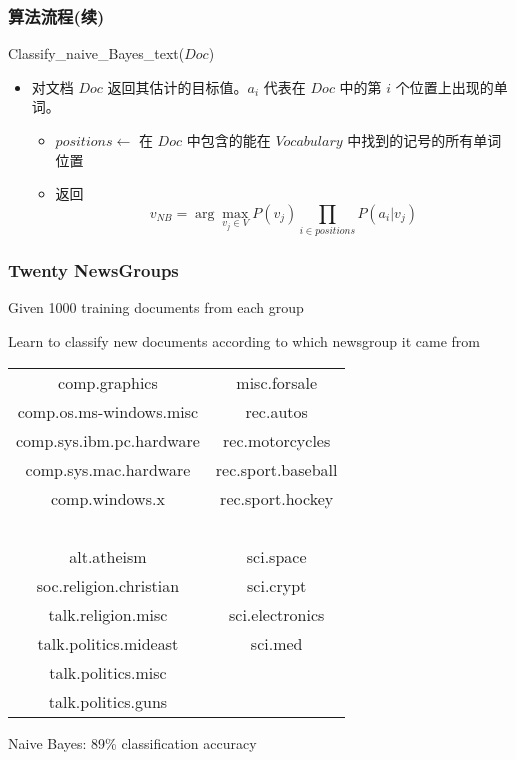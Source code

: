 \documentclass{beamer}
\begin{document}
\begin{frame}
\frametitle{算法流程(续)}
\label{sec-7-12}

Classify\_{}naive\_{}Bayes\_{}text($Doc$)
\begin{itemize}
\item 对文档 $Doc$ 返回其估计的目标值。$a_i$ 代表在 $Doc$ 中的第 $i$ 个位置上出现的单词。
\begin{itemize}
\item $positions \leftarrow$ 在 $Doc$ 中包含的能在 $Vocabulary$ 中找到的记号的所有单词位置
\item 返回
     $$v_{NB} = \arg\max_{v_{j} \in V} P(v_{j}) \prod_{i \in positions}P(a_{i}|v_{j})$$
\end{itemize}
\end{itemize}
\end{frame}
\begin{frame}
\frametitle{Twenty NewsGroups}
\label{sec-7-13}


\small

Given 1000 training documents from each group

Learn to classify new documents according to which newsgroup it came from

\bigskip
\begin{center}
\begin{tabular}{cc}
comp.graphics & misc.forsale\\
comp.os.ms-windows.misc & rec.autos \\
comp.sys.ibm.pc.hardware & rec.motorcycles \\
comp.sys.mac.hardware & rec.sport.baseball \\
comp.windows.x & rec.sport.hockey \\
\ & \ \\
alt.atheism & sci.space \\
soc.religion.christian  & sci.crypt\\
talk.religion.misc & sci.electronics\\
talk.politics.mideast & sci.med \\
talk.politics.misc & \ \\
talk.politics.guns & \ \\
\end{tabular}
\end{center}


Naive Bayes: 89\% classification accuracy
\end{frame}
\end{document}
